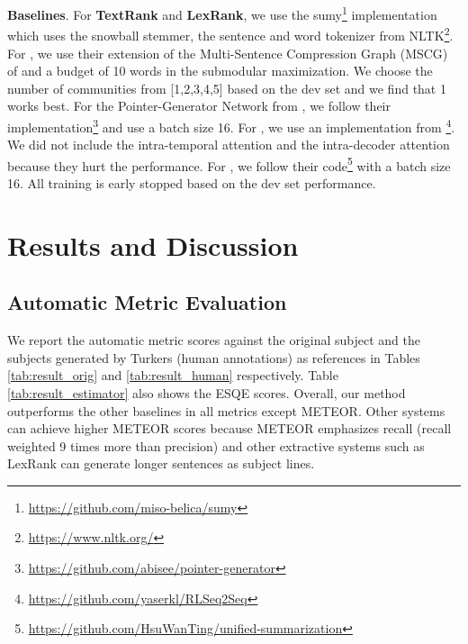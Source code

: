 \documentclass[11pt,a4paper]{article}
\newcommand{\esqe}{{\sc ESQE}\xspace}
\begin{document}
\textbf{Baselines}.
For \textbf{TextRank} and \textbf{LexRank}, we use the sumy\footnote{\url{https://github.com/miso-belica/sumy}} implementation which uses the snowball stemmer, the sentence and word tokenizer from NLTK\footnote{\url{https://www.nltk.org/}}.
For \textbf{}, we use their extension of the Multi-Sentence Compression Graph (MSCG) of  and a budget of 10 words in the submodular maximization.
We choose the number of communities from [1,2,3,4,5] based on the dev set and we find that 1 works best. 
For the Pointer-Generator Network from \textbf{}, we follow their implementation\footnote{\url{https://github.com/abisee/pointer-generator}} and use a batch size 16.
For \textbf{}, we use an implementation from \footnote{\url{https://github.com/yaserkl/RLSeq2Seq}}.
We did not include the intra-temporal attention and the intra-decoder attention because they hurt the performance.
For \textbf{}, we follow their code\footnote{\url{https://github.com/HsuWanTing/unified-summarization}} with a batch size 16.
All training is early stopped based on the dev set performance.



\section{Results and Discussion}
\subsection{Automatic Metric Evaluation}
We report the automatic metric scores against the original subject and the subjects generated by Turkers (human annotations) as references in Tables \ref{tab:result_orig} and  \ref{tab:result_human} respectively.
Table \ref{tab:result_estimator} also shows the \esqe scores.
Overall, our method outperforms the other baselines in all metrics except METEOR.
Other systems can achieve higher METEOR scores because METEOR emphasizes recall (recall weighted 9 times more than precision) and other extractive systems such as LexRank can generate longer sentences as subject lines.
\end{document}
